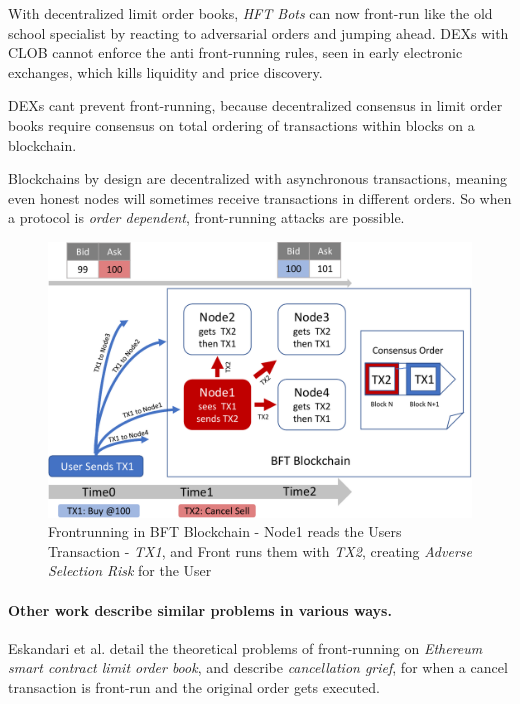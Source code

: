 \documentclass[12pt]{article}
\begin{document}
With decentralized limit order books, \emph{HFT Bots} can now front-run like the old school specialist by reacting to adversarial orders and jumping ahead. 
DEXs with CLOB cannot enforce the anti front-running rules, seen in early electronic exchanges, which kills liquidity and price discovery. 

DEXs cant prevent front-running, because decentralized consensus in limit order books require consensus on total ordering of transactions within blocks on a blockchain. 

Blockchains by design are decentralized with asynchronous transactions, meaning even honest nodes will sometimes receive transactions in different orders. So when a protocol is \emph{order dependent}, front-running attacks are possible.

\begin{figure}[ht]
  \centering \includegraphics[scale=0.4]{frontrunning3-crop.pdf}
  \caption{Frontrunning in BFT Blockchain - Node1 reads the Users Transaction - \emph{TX1}, and Front runs them with \emph{TX2}, creating \emph{Adverse Selection Risk} for the User}\label{fig:front-running}
\end{figure}

\paragraph{Other work describe similar problems in various ways.} Eskandari et al. \cite{Eskandari} detail the theoretical problems of front-running on \emph{Ethereum} \emph{smart contract limit order book}, and describe \emph{cancellation grief}, for when a cancel transaction is front-run and the  original order gets executed. 
\end{document}
